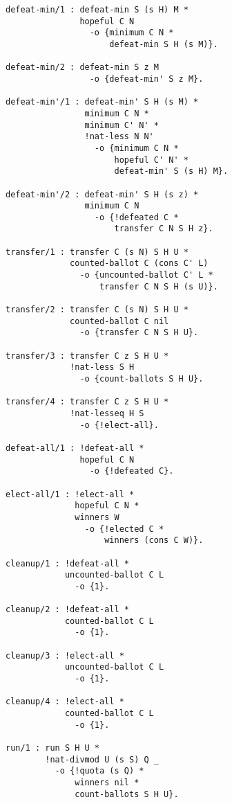 \begin{lstlisting}[basicstyle=\footnotesize\ttfamily,numbers=none]
defeat-min/1 : defeat-min S (s H) M *
               hopeful C N
                 -o {minimum C N *
                     defeat-min S H (s M)}.

defeat-min/2 : defeat-min S z M
                 -o {defeat-min' S z M}.

defeat-min'/1 : defeat-min' S H (s M) *
                minimum C N *
                minimum C' N' *
                !nat-less N N'
                  -o {minimum C N *
                      hopeful C' N' *
                      defeat-min' S (s H) M}.

defeat-min'/2 : defeat-min' S H (s z) *
                minimum C N
                  -o {!defeated C *
                      transfer C N S H z}.

transfer/1 : transfer C (s N) S H U *
             counted-ballot C (cons C' L)
               -o {uncounted-ballot C' L *
                   transfer C N S H (s U)}.

transfer/2 : transfer C (s N) S H U *
             counted-ballot C nil
               -o {transfer C N S H U}.

transfer/3 : transfer C z S H U *
             !nat-less S H
               -o {count-ballots S H U}.

transfer/4 : transfer C z S H U *
             !nat-lesseq H S
               -o {!elect-all}.

defeat-all/1 : !defeat-all *
               hopeful C N
                 -o {!defeated C}.

elect-all/1 : !elect-all *
              hopeful C N *
              winners W
                -o {!elected C *
                    winners (cons C W)}.

cleanup/1 : !defeat-all *
            uncounted-ballot C L
              -o {1}.

cleanup/2 : !defeat-all *
            counted-ballot C L
              -o {1}.

cleanup/3 : !elect-all *
            uncounted-ballot C L
              -o {1}.

cleanup/4 : !elect-all *
            counted-ballot C L
              -o {1}.

run/1 : run S H U *
        !nat-divmod U (s S) Q _
          -o {!quota (s Q) *
              winners nil *
              count-ballots S H U}.
\end{lstlisting}

